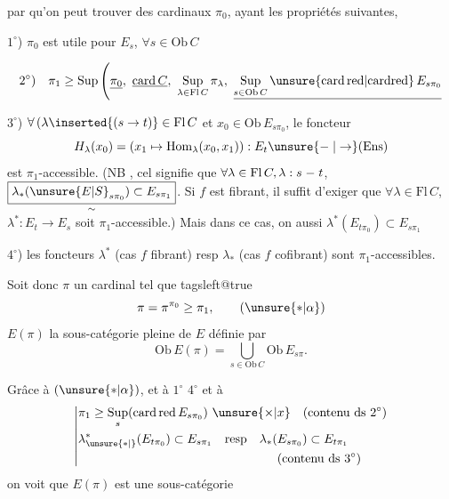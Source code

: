 par  qu'on peut trouver des cardinaux $\pi_0$,  ayant les propriétés suivantes,

\textcircled{\scriptsize $1^\circ$}) $\pi_0$ est utile pour $E_s$, $\forall s\in\mathrm{Ob}\,C$

\[ 2^\circ)\quad \pi_1\geq\mathrm{Sup}\left(\underline{\pi_0},\ \underline{\mathrm{card}\,C},\ \mathop{\mathrm{Sup}}\limits_{\lambda\in\mathrm{Fl}\,C}\pi_\lambda,\ \underline{\mathop{\mathrm{Sup}}\limits_{s\in\mathrm{Ob}\,C}\unsure{\mathrm{card\,red}|\mathrm{cardred}}\,E_{s\pi_0}}\right. \]

\textcircled{\scriptsize $3^\circ$}) $\forall\,(\lambda\inserted{(s\to t)}\in\mathrm{Fl}\,C$ et $x_0\in\mathrm{Ob}\,E_{s\pi_0}$, le foncteur
\[ H_\lambda(x_0)=(x_1\mapsto\mathrm{Hom}_\lambda(x_0,x_1)):E_t\unsure{\relbar|\to}(\mathrm{Ens}) \]
est $\pi_1$-accessible. (NB   , cel signifie que $\forall\lambda\in\mathrm{Fl}\,C,\lambda:s\relbar t$, $\underset{\sim}{\boxed{\lambda_*(\unsure{E|S}_{s\pi_0})\subset E_{s\pi_1}}}$.
Si $f$ est fibrant, il suffit d'exiger que  $\forall\lambda\in\mathrm{Fl}\,C$, $\lambda^*:E_t\to E_s$ soit $\pi_1$-accessible.) Mais dans ce cas, on  aussi $\boxed{\lambda^*(E_{t\pi_0})\subset E_{s\pi_1}}$

\textcircled{\scriptsize $4^\circ$}) les foncteurs $\lambda^*$ (cas $f$ fibrant) resp $\lambda_*$ (cas $f$ cofibrant) sont $\pi_1$-accessibles.

Soit donc $\pi$ un cardinal tel que
{\csname tagsleft@true\endcsname
\[ \pi=\pi^{\pi_0}\geq\pi_1, \tag*{$(\unsure{*|\alpha})$} \]}
  $E(\pi)$ la sous-catégorie  pleine de $E$  définie par
\[ \mathrm{Ob}\,E(\pi)=\bigcup_{s\in\mathrm{Ob}\,C}\mathrm{Ob}\,E_{s\pi}. \]

Grâce à $(\unsure{*|\alpha})$, et à $1^\circ$ $4^\circ$ et à
\[ \left|\begin{aligned}
&\pi_1\geq\mathop{\mathrm{Sup}}\limits_s(\mathrm{card\,red}\,E_{s\pi_0})\ \unsure{\times|x}\quad\text{(contenu ds }2^\circ)\\
&\lambda^{*}_{\unsure{*|{}}}(E_{t\pi_0})\subset E_{s\pi_1}\quad\text{resp}\quad\lambda_*(E_{s\pi_0})\subset E_{t\pi_1}\\[-1pt]
&\hspace{16em}\text{(contenu ds }3^\circ)
\end{aligned}\right. \]
on voit que $E(\pi)$ est une sous-catégorie


